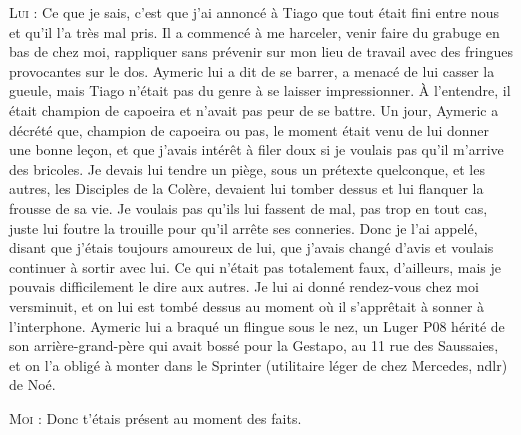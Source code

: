 \begin{dialogue}
\illusloflabel{}%
\textsc{Lui} : Ce que je sais, c’est que j’ai annoncé à Tiago que tout était fini entre nous et qu’il l’a très mal pris. Il a commencé à me harceler, venir faire du grabuge en bas de chez moi, rappliquer sans prévenir sur mon lieu de travail avec des fringues provocantes sur le dos. Aymeric lui a dit de se barrer, a menacé de lui casser la gueule, mais Tiago n’était pas du genre à se laisser impressionner. À l’entendre, il était champion de capoeira et n’avait pas peur de se battre. Un jour, Aymeric a décrété que, champion de capoeira ou pas, le moment était venu de lui donner une bonne leçon, et que j’avais intérêt à filer doux si je voulais pas qu’il m’arrive des bricoles. Je devais lui tendre un piège, sous un prétexte quelconque, et les autres, les Disciples de la Colère, devaient lui tomber dessus et lui flanquer la frousse de sa vie. Je voulais pas qu’ils lui fassent de mal, pas trop en tout cas, juste lui foutre la trouille pour qu’il arrête ses conneries. Donc je l’ai appelé, disant que j’étais toujours amoureux de lui, que j’avais changé d’avis et voulais continuer à sortir avec lui. Ce qui n’était pas totalement faux, d’ailleurs, mais je pouvais difficilement le dire aux autres. Je lui ai donné rendez-vous chez moi versminuit, et on lui est tombé dessus au moment où il s’apprêtait à sonner à l’interphone. Aymeric lui a braqué un flingue sous le nez, un Luger P08 hérité de son arrière-grand-père qui avait bossé pour la Gestapo, au 11 rue des Saussaies, et on l’a obligé à monter dans le Sprinter (utilitaire léger de chez Mercedes, ndlr) de Noé.

\textsc{Moi} : Donc t’étais présent au moment des faits.


\end{dialogue}

